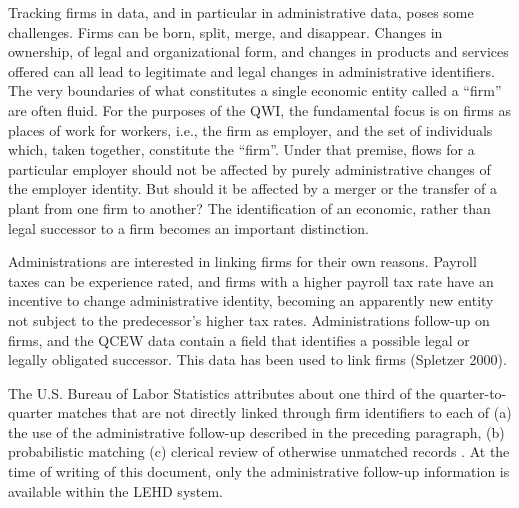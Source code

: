 
%


Tracking firms in data, and in particular in administrative data, poses
some challenges. Firms can be born, split, merge, and disappear. Changes in
ownership, of legal and organizational form, and changes in products and
services offered can all lead to legitimate and legal changes in
administrative identifiers. The very boundaries of what constitutes a
single economic entity called a ``firm'' are often fluid.  For the purposes
of the QWI, the fundamental focus is on firms as places of work for
workers, i.e., the firm as employer, and the set of individuals which,
taken together, constitute the ``firm''. Under that premise, flows for a
particular employer should not be affected by purely administrative changes
of the employer identity.  But should it be affected by a merger or the
transfer of a plant from one firm to another? The identification of an
economic, rather than legal successor to a firm becomes an important
distinction.

Administrations are  interested in linking firms for their own
reasons. Payroll taxes can be experience rated, and firms with a higher
payroll tax rate have an incentive to change administrative identity,
becoming an apparently new entity not subject to the predecessor's higher
tax rates. Administrations follow-up on firms, and the QCEW data contain a
field that identifies a possible legal or legally obligated successor. This
data has been used to link firms (Spletzer 2000). 

The U.S. Bureau of Labor Statistics attributes about one third of the
quarter-to-quarter matches that are not directly linked through firm
identifiers to each of (a) the use of the administrative follow-up
described in the preceding paragraph, (b) probabilistic matching (c)
clerical review of otherwise unmatched records \citep{PivetzEtAl2001,ClaytonSpletzter2004}. At the time of writing of this
document, only the administrative follow-up information is available within
the LEHD system. 

